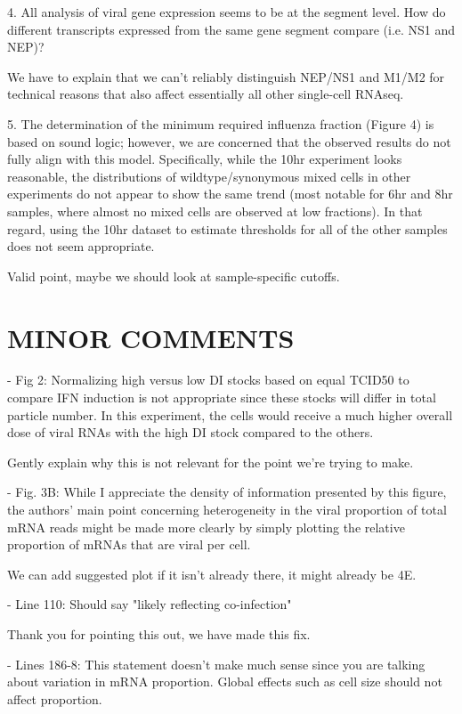 \documentclass[11pt, oneside]{article}   	%
\begin{document}
4. All analysis of viral gene expression seems to be at the segment level. How do different transcripts expressed from the same gene segment compare (i.e. NS1 and NEP)? 

{\color{red}
We have to explain that we can't reliably distinguish NEP/NS1 and M1/M2 for technical reasons that also affect essentially all other single-cell RNAseq.
}

5. The determination of the minimum required influenza fraction (Figure 4) is based on sound logic; however, we are concerned that the observed results do not fully align with this model. Specifically, while the 10hr experiment looks reasonable, the distributions of wildtype/synonymous mixed cells in other experiments do not appear to show the same trend (most notable for 6hr and 8hr samples, where almost no mixed cells are observed at low fractions). In that regard, using the 10hr dataset to estimate thresholds for all of the other samples does not seem appropriate. 

{\color{red}
Valid point, maybe we should look at sample-specific cutoffs.
}

\section*{MINOR COMMENTS}

- Fig 2: Normalizing high versus low DI stocks based on equal TCID50 to compare IFN induction is not appropriate since these stocks will differ in total particle number. In this experiment, the cells would receive a much higher overall dose of viral RNAs with the high DI stock compared to the others. 

{\color{red}
Gently explain why this is not relevant for the point we're trying to make.
}

- Fig. 3B: While I appreciate the density of information presented by this figure, the authors' main point concerning heterogeneity in the viral proportion of total mRNA reads might be made more clearly by simply plotting the relative proportion of mRNAs that are viral per cell. 

{\color{red}
We can add suggested plot if it isn't already there, it might already be 4E.
}

- Line 110: Should say "likely reflecting co-infection" 

{\color{black}
Thank you for pointing this out, we have made this fix.}

- Lines 186-8: This statement doesn't make much sense since you are talking about variation in mRNA proportion. Global effects such as cell size should not affect proportion. 
\end{document}
